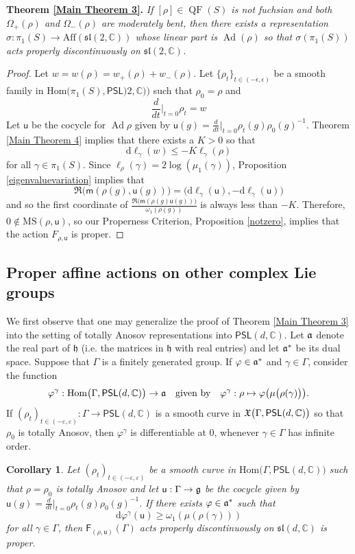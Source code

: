 \documentclass{amsart}
\theoremstyle{plain}
\newtheorem{corollary}[proposition]{Corollary}
\theoremstyle{definition}
\theoremstyle{remark}
\newcommand{\Ad}{\operatorname{Ad}}
\newcommand{\QF}{\operatorname{QF}}
\newcommand{\PSL}{\mathsf{PSL}}
\newcommand{\aff}[1]{\sf{F}_{#1}}
\renewcommand{\sf}[1]{{\mathsf{#1}}}
\newcommand{\h}{{\mathfrak h}}
\newcommand{\C}{\mathbb C}
\renewcommand{\sl}{\mathfrak{sl}}
\newcommand{\<}{\left <}
\renewcommand{\>}{\right >}
\newcommand{\G}{\Gamma}
\newcommand{\g}{\gamma}
\newcommand{\M}{\mathrm{MS}}
\newcommand{\co}{\sf u}
\renewcommand{\C}{\mathbb C}
\renewcommand{\a}{\frak a}
\newcommand{\eps}{\varepsilon}
\newcommand{\dd}{{\mathrm{d}}}
\begin{document}
\medskip\noindent
{\bf Theorem \ref{Main Theorem 3}.} {\em
If $[\rho]\in \QF(S)$ is not fuchsian and both $\Omega_+(\rho)$ and $\Omega_-(\rho)$ are moderately bent,
then there exists a representation $\sigma:\pi_1(S)\to\mathrm{Aff}(\sl(2,\mathbb C))$  whose linear part is $\Ad(\rho)$
so that $\sigma(\pi_1(S))$ acts properly discontinuously on $\sl(2,\C)$.}

\medskip


\begin{proof}
Let $w=w(\rho)=w_+(\rho)+w_-(\rho)$.
Let $\{\rho_t\}_{t\in (-\epsilon,\epsilon)}$ be a smooth family in $\mathrm{Hom}\big(\pi_1(S),\PSL)2,\C)\big)$ such that $\rho_0=\rho$ and 
$$\frac{d}{dt}\Big|_{t=0} \rho_t=w$$ 
Let $\co$ be the cocycle for $\Ad\rho$ given by 
 $\co(g)=\frac{d}{dt}\Big|_{t=0}\rho_t(g)\rho_0(g)^{-1}.$
Theorem \ref{Main Theorem 4} implies that there exists a $K > 0$ so that
$$\dd\ell_\g(w) \leq  -K \ell_\g(\rho)$$
for all $\g\in\pi_1(S)$. Since $\ell_\rho(\gamma)=2\log(\mu_1(\gamma))$, Proposition \ref{eigenvaluevariation}
implies that 
$$\Re\Big(\sf m(\rho(g),\co(g))\Big)=\Big(\dd\ell_\g(\co) ,-\dd\ell_\g(\co)\Big) $$
and so the first coordinate of $\frac{\Re\big(\sf m(\rho(g)\co(g))\big)}{\omega_1(\rho(g))}$ is always less than $-K$. 
Therefore, $0\notin\M(\rho,\co)$, so our Properness Criterion, 
Proposition \ref{notzero}, implies that the action $F_{\rho,\co}$ is proper. 
\end{proof}

\subsection{Proper affine actions on other complex Lie groups}
\label{others}
We first observe that one may generalize the proof of Theorem \ref{Main Theorem 3} into the setting of totally Anosov
representations into $\PSL(d,\C)$.
Let $\a$ denote the real part of $\h$ (i.e. the matrices in $\h$ with real entries) and let $\a^*$ be its dual space.
Suppose that $\Gamma$ is a finitely generated group.
If $\varphi\in\a^*$ and $\gamma\in\Gamma$,  consider the function 
$$\varphi^{\g}:\mathrm{Hom}\big(\G,\PSL(d,\C)\big)\to\a\quad\text{given by}\quad \varphi^{\g}:\rho\mapsto\varphi\big(\mu\big(\rho(\g)\big)\big).$$ 
If $(\rho_t)_{t\in(-\eps,\eps)}:\G\to\PSL(d,\C)$ is a smooth curve in $\frak X\big(\G,\PSL(d,\C)\big)$ so that $\rho_0$ is totally Anosov,
then $\varphi^\gamma$ is differentiable at 0, whenever $\gamma\in\Gamma$ has infinite order.


\begin{corollary}\label{properness criterion} Let $(\rho_t)_{t\in(-\eps,\eps)}$ be a smooth curve in $\mathrm{Hom}\big(\G,\PSL(d,\C)\big)$
such that $\rho=\rho_0$ is totally Anosov and let 
$\co:\G\to\frak g$ be the  cocycle given by  $\co(g)=\frac{d}{dt}\Big|_{t=0}\rho_t(g)\rho_0(g)^{-1}.$
If there exists $\varphi\in\a^*$ such that
$$\dd\varphi^\g (\co)\geq\omega_1(\mu(\rho(\g)))$$ 
for all $\gamma\in\Gamma$, then $\aff{(\rho,\co)}(\Gamma)$ acts properly discontinuously on $\sl(d,\C)$ is proper.
\end{corollary}
\end{document}
